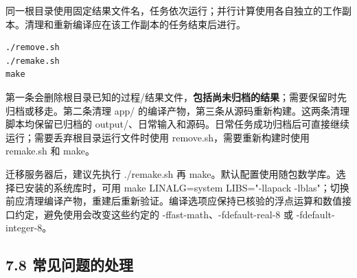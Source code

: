 \documentclass[UTF8,a4paper,zihao=5,fontset=fandol]{ctexart}
\begin{document}
同一根目录使用固定结果文件名，任务依次运行；并行计算使用各自独立的工作副本。清理和重新编译应在该工作副本的任务结束后进行。


\begin{Verbatim}[samepage=true,breaklines=true,breakanywhere=true,fontsize=\small,frame=leftline,framesep=3mm,rulecolor=\color{bluegray}]
./remove.sh
./remake.sh
make
\end{Verbatim}
第一条会删除根目录已知的过程/结果文件，\textbf{包括尚未归档的结果}；需要保留时先归档或移走。第二条清理 {\ttfamily\small app/\allowbreak{}} 的编译产物，第三条从源码重新构建。这两条清理脚本均保留已归档的 {\ttfamily\small output/\allowbreak{}}、日常输入和源码。日常任务成功归档后可直接继续运行；需要丢弃根目录运行文件时使用 {\ttfamily\small remove.\allowbreak{}sh}，需要重新构建时使用 {\ttfamily\small remake.\allowbreak{}sh} 和 {\ttfamily\small make}。

迁移服务器后，建议先执行 {\ttfamily\small .\allowbreak{}/\allowbreak{}remake.\allowbreak{}sh} 再 {\ttfamily\small make}。默认配置使用随包数学库。选择已安装的系统库时，可用 {\ttfamily\small make LINALG=\allowbreak{}system LIBS=\allowbreak{}"-llapack -lblas"}；切换前应清理编译产物，重建后重新验证。编译选项应保持已核验的浮点运算和数值接口约定，避免使用会改变这些约定的 {\ttfamily\small -ffast-math}、{\ttfamily\small -fdefault-real-8} 或 {\ttfamily\small -fdefault-integer-8}。

\subsection*{7.8 常见问题的处理}
\end{document}
